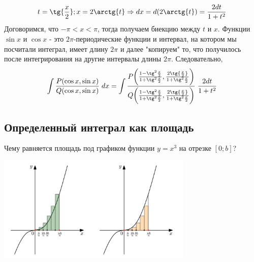 	\begin{explanation}
	\[ t = \tg{\frac{x}{2}}; x = 2\arctg{t} \Rightarrow dx = d(2\arctg{t}) = \frac{2dt}{1 + t^2} \]
	Договоримся, что $-\pi < x < \pi$, тогда получаем биекцию между $t$ и $x$. Функции $\sin{x}$ и $\cos{x}$ - это $2\pi$-периодические функции и интервал, на котором мы посчитали интеграл, имеет длину $2\pi$ и далее "копируем"  то, что получилось после интегрирования на другие интервалы длины $2\pi$.
	Следовательно,
	\[ \displaystyle\int \frac{P(\cos{x}, \sin{x})}{Q(\cos{x}, \sin{x})} \; dx = \int \frac{P\bigg(\frac{1 - \tg^2{\frac{x}{2}}}{1 + \tg^2{\frac{x}{2}}}, \frac{2\tg{\frac{x}{2}}}{1 + \tg^2{\frac{x}{2}}}\bigg)}{Q\bigg(\frac{1 - \tg^2{\frac{x}{2}}}{1 + \tg^2{\frac{x}{2}}}, \frac{2\tg{\frac{x}{2}}}{1 + \tg^2{\frac{x}{2}}}\bigg)} \; \frac{2dt}{1 + t^2} \]
	\end{explanation}
	
	\subsection{Определенный интеграл как площадь}
	
	\begin{example}
		Чему равняется площадь под графиком функции
		$y = x^3$ на отрезке $[0; b]$?
		\begin{center}
			\includegraphics[width=0.7\textwidth]{img/lecture24/definite_integral}
		\end{center}
	\end{example}
	
